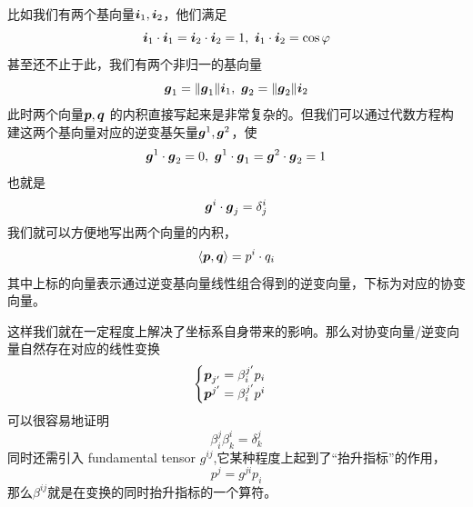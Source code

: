 \documentclass[12pt,a4paper,openany,twoside]{book}
\numberwithin{equation}{section}
\newcommand{\mean}[1]{\left\langle #1 \right\rangle}
\begin{document}
        比如我们有两个基向量$\vb*{i}_1,\vb*{i}_2$，他们满足
        \begin{equation*}
          \vb*{i}_1\cdot\vb*{i}_1=\vb*{i}_2\cdot\vb*{i}_2=1,\ \vb*{i}_1\cdot\vb*{i}_2=\cos{\varphi}
        \end{equation*} 
        甚至还不止于此，我们有两个非归一的基向量
        \begin{equation*}
          \vb*{g}_1=\norm{\vb*{g}_1}\vb*{i}_1,\ \vb*{g}_2=\norm{\vb*{g}_2}\vb*{i}_2
        \end{equation*} 
        此时两个向量$\vb*{p},\vb*{q}$ 的内积直接写起来是非常复杂的。但我们可以通过代数方程构建这两个基向量对应的逆变基矢量$\vb*{g}^1,\vb*{g}^2$，使
        \begin{equation*}
          \vb*{g}^1\cdot\vb*{g}_2=0,\ \vb*{g}^1\cdot\vb*{g}_1=\vb*{g}^2\cdot\vb*{g}_2=1 
        \end{equation*} 
        也就是
        \begin{equation*}
          \vb*{g}^i\cdot\vb*{g}_j=\delta^i_j
        \end{equation*}
        我们就可以方便地写出两个向量的内积，
        \begin{equation*}
          \mean{\vb*{p},\vb*{q}}=p^i \cdot q_i
        \end{equation*} 
        其中上标的向量表示通过逆变基向量线性组合得到的逆变向量，下标为对应的协变向量。

        这样我们就在一定程度上解决了坐标系自身带来的影响。那么对协变向量/逆变向量自然存在对应的线性变换
        \begin{equation*}
          \begin{cases}
            \vb*{p}_{j'}=\beta^{j'}_i p_i \\
            \vb*{p}^{j'}=\beta^{j'}_i p^i
          \end{cases}
        \end{equation*} 
        可以很容易地证明
        \begin{equation*}
          \beta^j_i\beta^i_k=\delta^j_k
        \end{equation*}
        同时还需引入 fundamental tensor $g^{ij}$,它某种程度上起到了“抬升指标”的作用，
        \begin{equation*}
          p^j=g^{ji}p_i
        \end{equation*} 
        那么$\beta^{ij}$就是在变换的同时抬升指标的一个算符。
\end{document}
